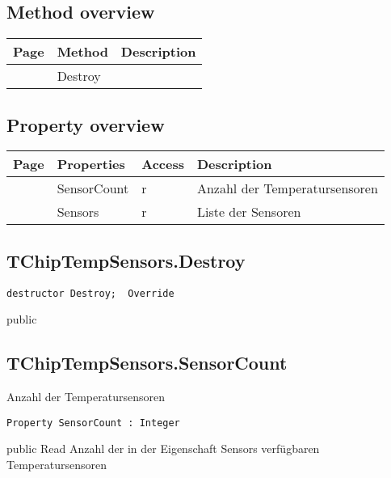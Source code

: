 \subsection{Method overview}
\label{computer:chiptemp:tchiptempsensors:methods}
\begin{tabularx}{\textwidth}{llX}
Page & Method & Description  \\ \hline
\pageref{computer:chiptemp:tchiptempsensors:destroy} & Destroy  &  \\
\hline
\end{tabularx}
\subsection{Property overview}
\label{computer:chiptemp:tchiptempsensors:properties}
\begin{tabularx}{\textwidth}{lllX}
Page & Properties & Access & Description \\ \hline
\pageref{computer:chiptemp:tchiptempsensors:sensorcount} & SensorCount & r & Anzahl der Temperatursensoren \\
\pageref{computer:chiptemp:tchiptempsensors:sensors} & Sensors & r & Liste der Sensoren \\
\hline
\end{tabularx}
\subsection{TChipTempSensors.Destroy}
\label{computer:chiptemp:tchiptempsensors:destroy}
\begin{FPCList}
\Declaration 

\begin{verbatim}
destructor Destroy;  Override
\end{verbatim}
\Visibility
public
\end{FPCList}
\subsection{TChipTempSensors.SensorCount}
\label{computer:chiptemp:tchiptempsensors:sensorcount}
\begin{FPCList}
\Synopsis
Anzahl der Temperatursensoren\Declaration 

\begin{verbatim}
Property SensorCount : Integer
\end{verbatim}
\Visibility
public
\Access
Read
\Description
Anzahl der in der Eigenschaft Sensors verfügbaren Temperatursensoren\end{FPCList}
